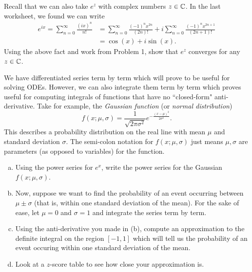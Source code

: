 \documentclass[12pt]{article} %
\begin{document}
\begin{problem}
Recall that we can also take $e^z$ with complex numbers $z\in \mathbb{C}$. In the last worksheet, we found we can write
\begin{align*}
e^{ix} = \sum_{n=0}^\infty \frac{(ix)^n}{n!}&= \sum_{n=0}^\infty \frac{(-1)^n x^{2n}}{(2n)!} + i \sum_{n=0}^\infty \frac{(-1)^n x^{2n+1}}{(2n+1)!}\\
&= \cos(x) + i \sin(x).
\end{align*}
Using the above fact and work from Problem 1, show that $e^z$ converges for any $z\in \mathbb{C}$.
\end{problem}

\begin{problem}
We have differentiated series term by term which will prove to be useful for solving ODEs.  However, we can also integrate them term by term which proves useful for computing integrals of functions that have no ``closed-form" anti-derivative.  Take for example, the \emph{Gaussian function} (or \emph{normal distribution})
\[
f(x;\mu,\sigma)=\frac{1}{\sqrt{2\pi \sigma^2}}e^{-\frac{(x-\mu)^2}{2\sigma^2}}.  
\]
This describes a probability distribution on the real line with mean $\mu$ and standard deviation $\sigma$. The semi-colon notation for $f(x;\mu,\sigma)$ just means $\mu,\sigma$ are parameters (as opposed to variables) for the function.
\begin{enumerate}[(a)]
    \item Using the power series for $e^x$, write the power series for the Gaussian $f(x;\mu,\sigma)$.
    \item Now, suppose we want to find the probability of an event occurring between $\mu \pm \sigma$ (that is, within one standard deviation of the mean).  For the sake of ease, let $\mu=0$ and $\sigma=1$ and integrate the series term by term.
    \item Using the anti-derivative you made in (b), compute an approximation to the definite integral on the region $[-1,1]$ which will tell us the probability of an event occuring within one standard deviation of the mean.
    \item Look at a $z$-score table to see how close your approximation is.
\end{enumerate}
\end{problem}
\end{document}
